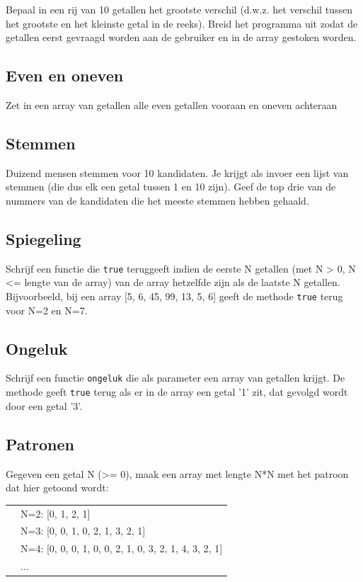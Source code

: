 Bepaal in een rij van 10 getallen het grootste verschil (d.w.z. het verschil tussen het grootste en het kleinste getal in de reeks). Breid het programma uit zodat de getallen eerst gevraagd worden aan de gebruiker en in de array gestoken worden.

\subsection{Even en oneven}

Zet in een array van getallen alle even getallen vooraan en oneven achteraan

\subsection{Stemmen}

Duizend mensen stemmen voor 10 kandidaten. Je krijgt als invoer een lijst van stemmen (die dus elk een getal tussen 1 en 10 zijn). Geef de top drie van de nummers van de kandidaten die het meeste stemmen hebben gehaald.

\subsection{Spiegeling}

Schrijf een functie die \texttt{true} teruggeeft indien de eerste N getallen (met N > 0, N <= lengte van de array) van de array hetzelfde zijn als de laatste N getallen. Bijvoorbeeld, bij een array [5, 6, 45, 99, 13, 5, 6] geeft de methode \texttt{true} terug voor N=2 en N=7.

\subsection{Ongeluk}

Schrijf een functie \texttt{ongeluk} die als parameter een array van getallen krijgt. De methode geeft \texttt{true} terug als er in de array een getal '1' zit, dat gevolgd wordt door een getal '3'.

\subsection{Patronen}

Gegeven een getal N (>= 0), maak een array met lengte N*N met het patroon dat hier getoond wordt:

\begin{tabular}{ p{5 mm} l }
 & N=2: [0, 1, \hspace{5 mm} 2, 1] \\
 & N=3: [0, 0, 1, \hspace{5 mm} 0, 2, 1, \hspace{5 mm} 3, 2, 1] \\
 & N=4: [0, 0, 0, 1, \hspace{5 mm} 0, 0, 2, 1, \hspace{5 mm} 0, 3, 2, 1, \hspace{5 mm} 4, 3, 2, 1] \\
 & ... \\
\end{tabular}

